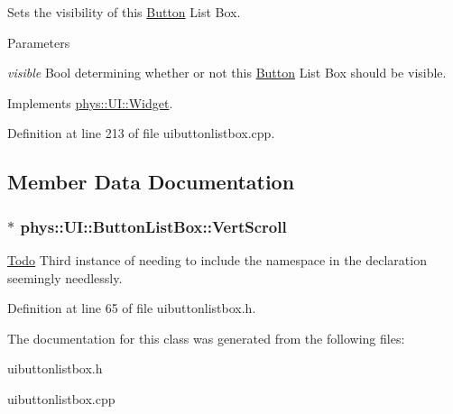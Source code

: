 Sets the visibility of this \hyperlink{classphys_1_1UI_1_1Button}{Button} List Box. 


\begin{DoxyParams}{Parameters}
\item[{\em visible}]Bool determining whether or not this \hyperlink{classphys_1_1UI_1_1Button}{Button} List Box should be visible. \end{DoxyParams}


Implements \hyperlink{classphys_1_1UI_1_1Widget_ab049233d8d5522a6ab42654b8924a3e0}{phys::UI::Widget}.



Definition at line 213 of file uibuttonlistbox.cpp.



\subsection{Member Data Documentation}
\hypertarget{classphys_1_1UI_1_1ButtonListBox_aa47d94d75c58e3408a97766eace2c20e}{
\subsubsection[{VertScroll}]{$\ast$ {\bf phys::UI::ButtonListBox::VertScroll}}}
\label{d4/dd7/classphys_1_1UI_1_1ButtonListBox_aa47d94d75c58e3408a97766eace2c20e}
\begin{Desc}
\item[\hyperlink{todo__todo000023}{Todo}]Third instance of needing to include the namespace in the declaration seemingly needlessly. \end{Desc}


Definition at line 65 of file uibuttonlistbox.h.



The documentation for this class was generated from the following files:\begin{DoxyCompactItemize}
\item 
uibuttonlistbox.h\item 
uibuttonlistbox.cpp\end{DoxyCompactItemize}
